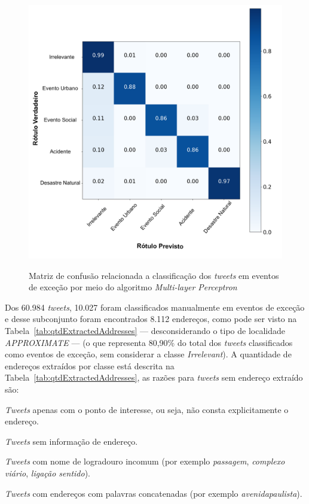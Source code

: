 \documentclass[
	12pt,				%
	oneside,			%
	a4paper,			%
	english,			%
	brazil				%
	]{abntex2ppgsi}
\begin{document}
{{{\begin{figure}[!htb]
	\centering
 	  \caption{Matriz de confusão relacionada a classificação dos \textit{tweets} em eventos de exceção por meio do algoritmo \textit{Multi-layer Perceptron}}
		\includegraphics[width=1\linewidth]{images/confusion_matrix_mlp_pt.png}
	\label{fig:confusion_matrix_mlp}
\end{figure}

Dos 60.984 \textit{tweets}, 10.027 foram classificados manualmente em eventos de exceção e desse subconjunto foram encontrados 8.112 endereços, como pode ser visto na Tabela~\ref{tab:qtdExtractedAddresses} --- desconsiderando o tipo de localidade \textit{APPROXIMATE}  --- (o que representa 80,90\% do total dos \textit{tweets} classificados como eventos de exceção, sem considerar a classe \textit{Irrelevant}). A quantidade de endereços extraídos por classe está descrita na Tabela~\ref{tab:qtdExtractedAddresses}, as razões para \textit {tweets} sem endereço extraído são:

\begin{enumerate*}
\item \textit{Tweets} apenas com o ponto de interesse, ou seja, não consta explicitamente o endereço.
\item \textit{Tweets} sem informação de endereço.
\item \textit{Tweets} com nome de logradouro incomum (por exemplo \emph{passagem}, \emph{complexo viário}, \emph{ligação sentido}).
\item \textit{Tweets} com endereços com palavras concatenadas (por exemplo \emph{avenidapaulista}).
\end{enumerate*}

}}}
\end{document}
